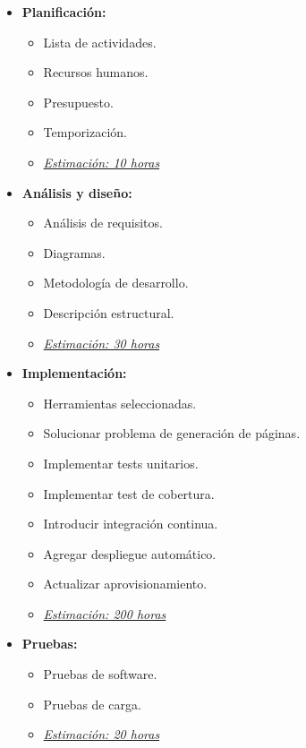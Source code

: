 \begin{itemize}
   \item \textbf{Planificación:}
   \begin{itemize}
    \item Lista de actividades.
    \item Recursos humanos.
    \item Presupuesto.
    \item Temporización.
    \item \underline{\textit{Estimación: 10 horas}}
   \end{itemize}
\end{itemize}

\begin{itemize}
   \item \textbf{Análisis y diseño:}
   \begin{itemize}
    \item Análisis de requisitos.
    \item Diagramas.
    \item Metodología de desarrollo.
    \item Descripción estructural.
    \item \underline{\textit{Estimación: 30 horas}}
   \end{itemize}
\end{itemize}

\begin{itemize}
 \item \textbf{Implementación:}
 \begin{itemize}
  \item Herramientas seleccionadas.
  \item Solucionar problema de generación de páginas.
  \item Implementar tests unitarios.
  \item Implementar test de cobertura.
  \item Introducir integración continua.
  \item Agregar despliegue automático.
  \item Actualizar aprovisionamiento.
  \item \underline{\textit{Estimación: 200 horas}}
 \end{itemize}
\end{itemize}

\newpage
\begin{itemize}
 \item \textbf{Pruebas:}
 \begin{itemize}
  \item Pruebas de software.
  \item Pruebas de carga.
  \item \underline{\textit{Estimación: 20 horas}}
 \end{itemize}
\end{itemize}

